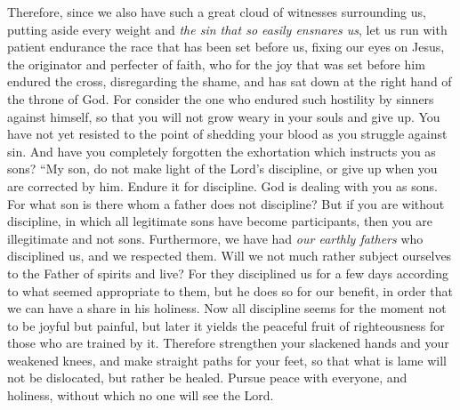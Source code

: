 \begin{biblechapter} %
 Therefore, since we also have such a great cloud of witnesses surrounding us, putting aside every weight and \textit{the sin that so easily ensnares us}, let us run with patient endurance the race that has been set before us,
\verse fixing our eyes on Jesus, the originator and perfecter of faith, who for the joy that was set before him endured the cross, disregarding the shame, and has sat down at the right hand of the throne of God.
\verse For consider the one who endured such hostility by sinners against himself, so that you will not grow weary in your souls and give up.
\verse You have not yet resisted to the point of shedding your blood as you struggle against sin.
\verse And have you completely forgotten the exhortation which instructs you as sons?
\verse “My son, do not make light of the Lord’s discipline, 
or give up when you are corrected by him.
\verse Endure it for discipline. God is dealing with you as sons. For what son is there whom a father does not discipline?
\verse But if you are without discipline, in which all legitimate sons have become participants, then you are illegitimate and not sons.
\verse Furthermore, we have had \textit{our earthly fathers} who disciplined us, and we respected them. Will we not much rather subject ourselves to the Father of spirits and live?
\verse For they disciplined us for a few days according to what seemed appropriate to them, but he does so for our benefit, in order that we can have a share in his holiness.
\verse Now all discipline seems for the moment not to be joyful but painful, but later it yields the peaceful fruit of righteousness for those who are trained by it.
 Therefore strengthen your slackened hands and your weakened knees,
\verse and make straight paths for your feet, so that what is lame will not be dislocated, but rather be healed.
\verse Pursue peace with everyone, and holiness, without which no one will see the Lord.

\end{biblechapter}
